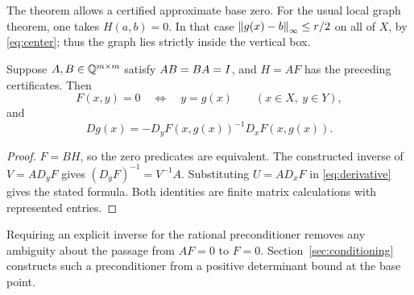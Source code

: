 The theorem allows a certified approximate base zero. For the usual
local graph theorem, one takes \(H(a,b)=0\). In that case
\(\left\lVert g(x)-b\right\rVert_\infty\le r/2\) on all of \(X\), by
\eqref{eq:center}; thus the graph lies strictly inside the vertical
box.

\begin{corollary}\label{cor:original}
Suppose \(A,B\in\mathbb Q^{m\times m}\) satisfy \(AB=BA=I\), and
\(H=AF\) has the preceding certificates. Then
\[
 F(x,y)=0\quad\Longleftrightarrow\quad y=g(x)
 \qquad(x\in X,\ y\in Y),
\]
and
\[
 Dg(x)=-D_yF(x,g(x))^{-1}D_xF(x,g(x)).
\]
\end{corollary}

\begin{proof}
\(F=BH\), so the zero predicates are equivalent.
The constructed inverse of \(V=AD_yF\) gives
\((D_yF)^{-1}=V^{-1}A\). Substituting \(U=AD_xF\) in
\eqref{eq:derivative} gives the stated formula. Both identities are
finite matrix calculations with represented entries.
\end{proof}

Requiring an explicit inverse for the rational preconditioner removes
any ambiguity about the passage from \(AF=0\) to \(F=0\).
Section~\ref{sec:conditioning} constructs such a preconditioner from
a positive determinant bound at the base point.
